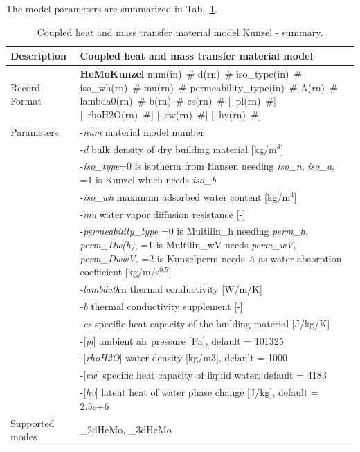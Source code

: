 \documentclass[a4paper]{article}
\newcommand{\descitem}[1]{{\noindent \bf #1}}
\newcommand{\elemparam}[2]{{{#1\tiny (#2)}~\#}}
\newcommand{\optelemparam}[2]{[{~\elemparam{#1}{#2}}]}
\newcommand{\param}[1]{{\it #1}}
\newcommand{\optparam}[1]{[{\it #1}]}
\newenvironment{mmt}{\begin{tabular}{|l|p{9cm}|}}{\end{tabular}\\}
\newenvironment{mmt}{\begin{tabular}{|l|l|}}{\end{tabular}\\}
\begin{document}
The model parameters are summarized in Tab.~\ref{hemokunzel_table}.
\begin{table}[!htb]
\begin{mmt}
\hline
Description & Coupled heat and mass transfer material model\\
\hline
Record Format & \descitem{HeMoKunzel} \elemparam{num}{in} \elemparam{d}{rn}
\elemparam{iso\_type}{in}
\elemparam{iso\_wh}{rn}
\elemparam{mu}{rn}
\elemparam{permeability\_type}{in}
\elemparam{A}{rn}
\elemparam{lambda0}{rn}
\elemparam{b}{rn}
\elemparam{cs}{rn}
\optelemparam{pl}{rn}
\optelemparam{rhoH2O}{rn}
\optelemparam{cw}{rn}
\optelemparam{hv}{rn}\\
Parameters &-\param{num} material model number\\
&-\param{d} bulk density of dry building material [kg/m$^3$]\\
&-\param{iso\_type}=0 is isotherm from Hansen needing \param{iso\_n}, \param{iso\_a}, =1 is Kunzel which needs \param{iso\_b}\\
&-\param{iso\_wh} maximum adsorbed water content [kg/m$^3$]\\
&-\param{mu} water vapor diffusion resistance [-]\\
&-\param{permeability\_type} =0 is Multilin\_h needing \param{perm\_h}, \param{perm\_Dw(h)}, =1 is Multilin\_wV needs \param{perm\_wV}, \param{perm\_DwwV}, =2 is Kunzelperm needs \param{A} as water absorption coefficient [kg/m/s$^0.5$]\\
&-\param{lambda0}{rn} thermal conductivity [W/m/K]\\
&-\param{b} thermal conductivity supplement [-]\\
&-\param{cs} specific heat capacity of the building material [J/kg/K]\\
&-\optparam{pl} ambient air pressure [Pa], default = 101325\\
&-\optparam{rhoH2O} water density [kg/m3], default = 1000\\
&-\optparam{cw} specific heat capacity of liquid water, default = 4183\\
&-\optparam{hv} latent heat of water phase change [J/kg], default = 2.5e+6\\
Supported modes& \_2dHeMo, \_3dHeMo\\
\hline
\end{mmt}
\caption{Coupled heat and mass transfer material model Kunzel - summary.}
\label{hemokunzel_table}
\end{table}
\end{document}
